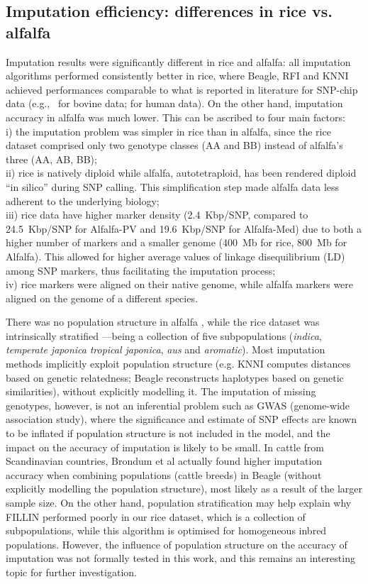 \subsection{Imputation efficiency: differences in rice vs. alfalfa}
\label{sec:role_of_species}
Imputation results were significantly different in rice and alfalfa: all imputation algorithms performed consistently better in rice, where Beagle, RFI and KNNI achieved performances comparable to what is reported in literature for SNP-chip data (e.g.,~\cite{vanraden_genomic_2013} for bovine data;
\cite{the_1000_genomes_project_consortium_integrated_2012}
for human data). On the other hand, imputation accuracy in alfalfa was much lower. This can be ascribed to four main factors: \\
i) the imputation problem was simpler in rice than in alfalfa, since the rice dataset comprised only two genotype classes (AA and BB) instead of alfalfa's three (AA, AB, BB); \\
ii) rice is natively diploid while alfalfa, autotetraploid, has been rendered diploid ``in silico'' during SNP calling. This simplification step made alfalfa data less adherent to the underlying biology;\\
iii) rice data have higher marker density (2.4~Kbp/SNP, compared to 24.5~Kbp/SNP for Alfalfa-PV and 19.6~Kbp/SNP for Alfalfa-Med) due to both a higher number of markers and a smaller genome (400~Mb for rice, 800~Mb for Alfalfa). This allowed for higher average values of linkage disequilibrium (LD) among SNP markers, thus facilitating the imputation process;\\
iv) rice markers were aligned on their native genome, while alfalfa markers were aligned on the genome of a different species.


There was no population structure in alfalfa \cite{Annicchiarico2015}, while the rice dataset was intrinsically stratified ---being a collection of five subpopulations (\textit{indica}, \textit{temperate japonica} \textit{tropical japonica}, \textit{aus} and \textit{aromatic}). Most imputation methods implicitly exploit population structure (e.g. KNNI computes distances based on genetic relatedness; Beagle reconstructs haplotypes based on genetic similarities), without explicitly modelling it. The imputation of missing genotypes, however, is not an inferential problem such as GWAS (genome-wide association study), where the significance and estimate of SNP effects are known to be inflated if population structure is not included in the model, and the impact on the accuracy of imputation is likely to be small. In cattle from Scandinavian countries, Brondum et al \cite{brondum2012short} actually found higher imputation accuracy when combining populations (cattle breeds) in Beagle (without explicitly modelling the population structure), most likely as a result of the larger sample size. On the other hand, population stratification may help explain why FILLIN performed poorly in our rice dataset, which is a collection of subpopulations, while this algorithm is optimised for homogeneous inbred populations. 
However, the influence of population structure on the accuracy of imputation was not formally tested in this work, and this remains an interesting topic for further investigation.


